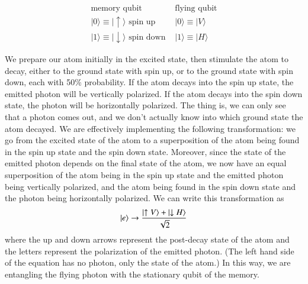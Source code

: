 \begin{equation}
\begin{array}{ll}
\text{memory qubit} & \text{flying qubit} \\
|0\rangle \equiv|\uparrow\rangle \text { spin up } & |0\rangle \equiv|V\rangle \\
|1\rangle \equiv|\downarrow\rangle \text { spin down } & |1\rangle \equiv|H\rangle
\end{array}
\end{equation}

We prepare our atom initially in the excited state, then stimulate the atom to decay, either to the ground state with spin up, or to the ground state with spin down, each with 50\% probability.  If the atom decays into the spin up state, the emitted photon will be vertically polarized.  If the atom decays into the spin down state, the photon will be horizontally polarized.  The thing is, we can only see that a photon comes out, and we don't actually know into which ground state the atom decayed. We are effectively implementing the following transformation: we go from the excited state of the atom to a superposition of the atom being found in the spin up state and the spin down state. 
Moreover, since the state of the emitted photon depends on the final state of the atom, we now have an equal superposition of the atom being in the spin up state and the emitted photon being vertically polarized, and the atom being found in the spin down state and the photon being horizontally polarized. We can write this transformation as
\begin{equation}
\left| e \right\rangle \rightarrow \frac{\left| \uparrow V \right\rangle+\left| \downarrow H \right\rangle}{\sqrt{2}}
\end{equation}
where the up and down arrows represent the post-decay state of the atom and the letters represent the polarization of the emitted photon.  (The left hand side of the equation has no photon, only the state of the atom.) In this way, we are entangling the flying photon with the stationary qubit of the memory.

